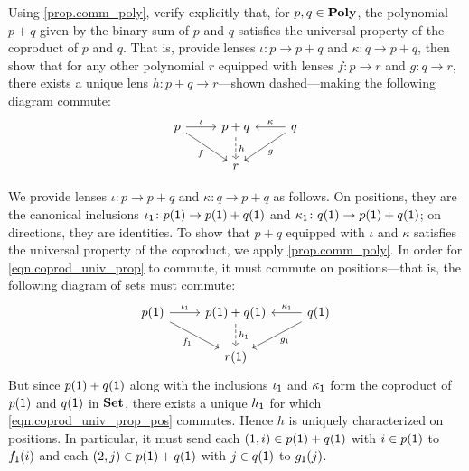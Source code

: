 \documentclass[Book-Poly]{subfiles}
\begin{document}
\begin{exercise}
Using \cref{prop.comm_poly}, verify explicitly that, for $p, q \in \mathbf{Poly}$, the polynomial $p+q$ given by the binary sum of $p$ and $q$ satisfies the universal property of the coproduct of $p$ and $q$.
That is, provide lenses $\iota \colon p \to p + q$ and $\kappa \colon q \to p + q$, then show that for any other polynomial $r$ equipped with lenses $f \colon p \to r$ and $g \colon q \to r$, there exists a unique lens $h\colon p+q\to r$---shown dashed---making the following diagram commute:
\begin{equation} \label{eqn.coprod_univ_prop}
\begin{tikzcd}
	p \ar[r, "\iota"] \ar[dr, "f"'] &
	p + q \ar[d, "h", dashed] &
	q \ar[l, "\kappa"'] \ar[dl, "g"] \\
	& r
\end{tikzcd}
\end{equation}
\begin{solution}
We provide lenses $\iota\colon p\to p+q$ and $\kappa\colon q\to p+q$ as follows.
On positions, they are the canonical inclusions $\iota_{\textsf{1}}\colon p(\textsf{1})\to p(\textsf{1})+q(\textsf{1})$ and $\kappa_{\textsf{1}}\colon q(\textsf{1})\to p(\textsf{1})+q(\textsf{1})$; on directions, they are identities.
To show that $p+q$ equipped with $\iota$ and $\kappa$ satisfies the universal property of the coproduct, we apply \cref{prop.comm_poly}.
In order for \eqref{eqn.coprod_univ_prop} to commute, it must commute on positions---that is, the following diagram of sets must commute:
\begin{equation} \label{eqn.coprod_univ_prop_pos}
\begin{tikzcd}
	p(\1) \ar[r, "\iota_\1"] \ar[dr, "f_\1"'] &
	p(\1) + q(\1) \ar[d, "h_\1", dashed] &
	q(\1) \ar[l, "\kappa_\1"'] \ar[dl, "g_\1"] \\
	& r(\1)
\end{tikzcd}
\end{equation}
But since $p(1)+q(\textsf{1})$ along with the inclusions $\iota_{\textsf{1}}$ and $\kappa_{\textsf{1}}$ form the coproduct of $p(\textsf{1})$ and $q(\textsf{1})$ in $\mathbf{Set}$, there exists a unique $h_{\textsf{1}}$ for which \eqref{eqn.coprod_univ_prop_pos} commutes.
Hence $h$ is uniquely characterized on positions.
In particular, it must send each $(1,i) \in p(\textsf{1})+q(\textsf{1})$ with $i \in p(\textsf{1})$ to $f_{\textsf{1}}(i)$ and each $(2,j) \in p(\textsf{1})+q(\textsf{1})$ with $j \in q(\textsf{1})$ to $g_{\textsf{1}}(j)$.


\end{solution}
\end{exercise}
\end{document}
